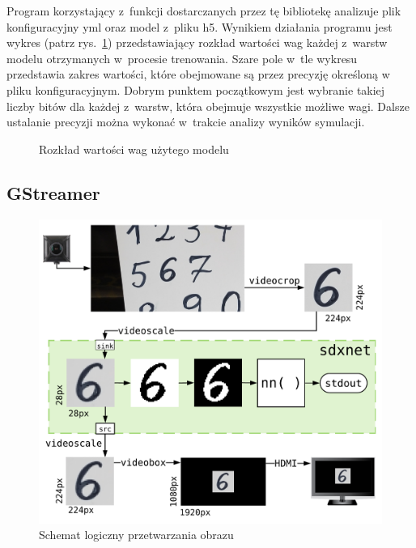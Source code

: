 \documentclass[12pt, oneside, a4paper]{article}
\begin{document}
Program korzystający z~funkcji dostarczanych przez tę bibliotekę
analizuje plik konfiguracyjny yml oraz model z~pliku h5.
Wynikiem działania programu jest wykres (patrz rys.~\ref{fig:weights_dist}) przedstawiający
rozkład wartości wag każdej z~warstw modelu otrzymanych w~procesie trenowania.
Szare pole w~tle wykresu
przedstawia zakres wartości, które obejmowane są przez precyzję określoną
w pliku konfiguracyjnym. Dobrym punktem początkowym jest wybranie takiej
liczby bitów dla każdej z~warstw, która obejmuje wszystkie możliwe wagi.
Dalsze ustalanie precyzji można wykonać w~trakcie analizy wyników
symulacji.
\begin{figure}[H]
  \centering
  
  \caption{Rozkład wartości wag użytego modelu}\label{fig:weights_dist}
\end{figure}


\subsection{GStreamer}\label{sec:GStreamer}
\begin{figure}[h]
  \centering
  \includegraphics[width=0.95\linewidth]{figures/image_flow.png}
  \caption{Schemat logiczny przetwarzania obrazu}\label{fig:image_flow}
\end{figure}
\end{document}
